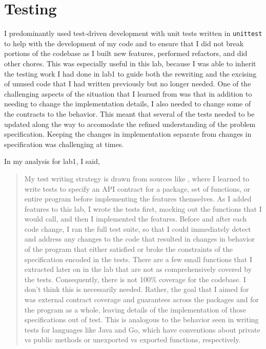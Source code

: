 \documentclass[10pt,letterpaper,final]{report}
\begin{document}
\section{Testing}\label{sec:testing}

I predominantly used test-driven development with unit tests written in \texttt{unittest} to help with the development of my code and to ensure that I did not break portions of the codebase as I built new features, performed refactors, and did other chores. This was especially useful in this lab, because I was able to inherit the testing work I had done in lab1 to guide both the rewriting and the excising of unused code that I had written previously but no longer needed. One of the challenging aspects of the situation that I learned from was that in addition to needing to change the implementation details, I also needed to change some of the contracts to the behavior. This meant that several of the tests needed to be updated along the way to accomodate the refined understanding of the problem specification. Keeping the changes in implementation separate from changes in specification was challenging at times.

In my analysis for lab1, I said,
\begin{quote}
  My test writing strategy is drawn from sources like , where I learned to write tests to specify an API contract for a package, set of functions, or entire program before implementing the features themselves. As I added features to this lab, I wrote the tests first, mocking out the functions that I would call, and then I implemented the features. Before and after each code change, I ran the full test suite, so that I could immediately detect and address any changes to the code that resulted in changes in behavior of the program that either satisfied or broke the constraints of the specification encoded in the tests. There are a few small functions that I extracted later on in the lab that are not as comprehensively covered by the tests. Consequently, there is not 100\% coverage for the codebase. I don't think this is necessarily needed. Rather, the goal that I aimed for was external contract coverage and guarantees across the packages and for the program as a whole, leaving details of the implementation of those specifications out of test. This is analogous to the behavior seen in writing tests for languages like Java and Go, which have conventions about private vs public methods or unexported vs exported functions, respectively.
\end{quote}
\end{document}

